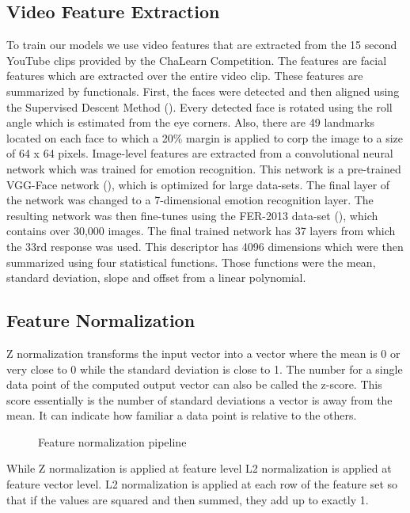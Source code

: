 \subsection{Video Feature Extraction}\label{subsection:featureextraction}
To train our models we use video features that are extracted from the 15 second YouTube clips provided by the ChaLearn Competition. The features are facial features which are extracted over the entire video clip. These features are summarized by functionals. First, the faces were detected and then aligned using the Supervised Descent Method (\cite{xiong2013supervised}). Every detected face is rotated using the roll angle which is estimated from the eye corners. Also, there are 49 landmarks located on each face to which a 20\% margin is applied to corp the image to a size of 64 x 64 pixels. Image-level features are extracted from a convolutional neural network which was trained for emotion recognition. This network is a pre-trained VGG-Face network (\cite{kaya2017video}), which is optimized for large data-sets. The final layer of the network was changed to a 7-dimensional emotion recognition layer. The resulting network was then fine-tunes using the FER-2013 data-set (\cite{goodfellow2015challenges}), which contains over 30,000 images. The final trained network has 37 layers from which the 33rd response was used. This descriptor has 4096 dimensions which were then summarized using four statistical functions. Those functions were the mean, standard deviation, slope and offset from a linear polynomial.

\subsection{Feature Normalization}
\label{subsection:normalization}
Z normalization transforms the input vector into a vector where the mean is 0 or very close to 0 while the standard deviation is close to 1. The number for a single data point of the computed output vector can also be called the z-score. This score essentially is the number of standard deviations a vector is away from the mean. It can indicate how familiar a data point is relative to the others. 

\begin{figure}[h]
  \centering
  
  \caption{Feature normalization pipeline}
  \label{fig:normpipeline}
\end{figure}

While Z normalization is applied at feature level L2 normalization is applied at feature vector level. L2 normalization is applied at each row of the feature set so that if the values are squared and then summed, they add up to exactly 1. 

